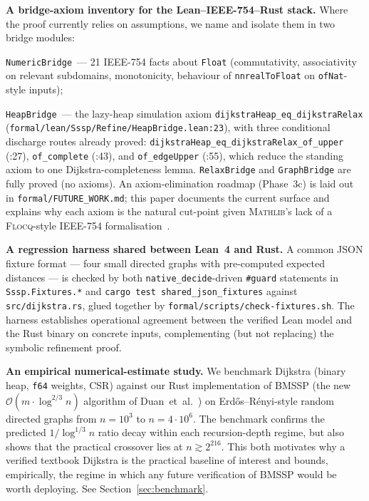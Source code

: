 \documentclass[11pt,a4paper]{article}
\makeatletter
\providecommand{\cref}[1]{Section~\ref{#1}}
\let\enitfb@enumerate\enumerate
\let\enitfb@endenumerate\endenumerate
\let\enitfb@itemize\itemize
\let\enitfb@enditemize\enditemize
\renewenvironment{enumerate}[1][]{\enitfb@enumerate}{\enitfb@endenumerate}%
\renewenvironment{itemize}[1][]{\enitfb@itemize}{\enitfb@enditemize}%
\newcommand{\Lean}{Lean~4\xspace}
\newcommand{\Mathlib}{\textsc{Mathlib}\xspace}
\newcommand{\BMSSP}{\textsc{BMSSP}\xspace}
\newcommand{\Dijkstra}{Dijkstra\xspace}
\newcommand{\Bigo}{\mathcal{O}}
\newcommand{\code}[1]{\texttt{#1}}
\theoremstyle{plain}
\theoremstyle{definition}
\makeatother
\begin{document}
\begin{enumerate}[leftmargin=2.2em,itemsep=0.35em]
\item \textbf{A bridge-axiom inventory for the Lean--IEEE-754--Rust stack.}
      Where the proof currently relies on assumptions, we name and isolate
      them in two bridge modules:
      \begin{itemize}[leftmargin=1.2em]
      \item \code{NumericBridge}~--- 21 IEEE-754 facts about \code{Float}
            (commutativity, associativity on relevant subdomains,
            monotonicity, behaviour of \code{nnrealToFloat} on
            \code{ofNat}-style inputs);
      \item \code{HeapBridge}~--- the lazy-heap simulation axiom
            \code{dijkstraHeap\_eq\_dijkstraRelax}
            (\code{formal/lean/Sssp/Refine/HeapBridge.lean:23}), with three
            conditional discharge routes already proved:
            \code{dijkstraHeap\_eq\_dijkstraRelax\_of\_upper} (:27),
            \code{of\_complete} (:43), and \code{of\_edgeUpper} (:55), which
            reduce the standing axiom to one Dijkstra-completeness lemma.
      \end{itemize}
      \code{RelaxBridge} and \code{GraphBridge} are fully proved (no axioms).
      An axiom-elimination roadmap (Phase~3c) is laid out in
      \code{formal/FUTURE\_WORK.md}; this paper documents the current
      surface and explains why each axiom is the natural cut-point given
      \Mathlib's lack of a \textsc{Flocq}-style IEEE-754
      formalisation~\cite{BoldoMelquiond2011Flocq,BoldoMelquiond2017Book}.

\item \textbf{A regression harness shared between \Lean{} and Rust.}
      A common JSON fixture format --- four small directed graphs with
      pre-computed expected distances --- is checked by both
      \code{native\_decide}-driven \code{\#guard} statements in
      \code{Sssp.Fixtures.*} and \code{cargo test shared\_json\_fixtures}
      against \code{src/dijkstra.rs}, glued together by
      \code{formal/scripts/check-fixtures.sh}. The harness establishes
      operational agreement between the verified Lean model and the Rust
      binary on concrete inputs, complementing (but not replacing) the
      symbolic refinement proof.

\item \textbf{An empirical numerical-estimate study.}
      We benchmark \Dijkstra{} (binary heap, \code{f64} weights, CSR) against
      our Rust implementation of \BMSSP{} (the new
      $\Bigo(m\cdot \log^{2/3} n)$ algorithm of
      Duan~et~al.~\cite{DuanMaoMaoShuYin2025}) on Erdős--Rényi-style random
      directed graphs from $n=10^3$ to $n=4 \cdot 10^6$. The benchmark
      confirms the predicted $1/\log^{1/3} n$ ratio decay within each
      recursion-depth regime, but also shows that the practical crossover
      lies at $n \gtrsim 2^{216}$. This both motivates why a verified
      textbook \Dijkstra{} is the practical baseline of interest and
      bounds, empirically, the regime in which any future verification of
      \BMSSP{} would be worth deploying. See \cref{sec:benchmark}.
\end{enumerate}
\end{document}
